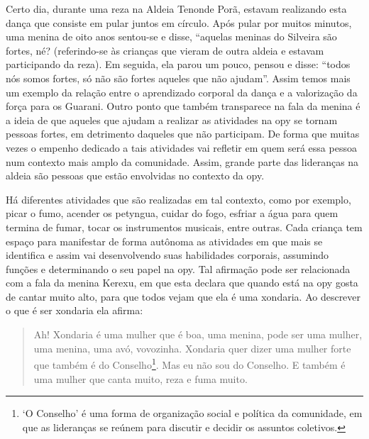 Certo dia, durante uma reza na Aldeia Tenonde Porã, estavam realizando
esta dança que consiste em pular juntos em círculo. Após pular por
muitos minutos, uma menina de oito anos sentou-se e disse, ``aquelas
meninas do Silveira são fortes, né? (referindo-se às crianças que
vieram de outra aldeia e estavam participando da reza). Em seguida, ela
parou um pouco, pensou e disse: ``todos nós somos fortes, só não são
fortes aqueles que não ajudam''. Assim temos mais um exemplo da relação
entre o aprendizado corporal da dança e a valorização da força para os
Guarani. Outro ponto que também transparece na fala da menina é a ideia
de que aqueles que ajudam a realizar as atividades na opy se tornam
pessoas fortes, em detrimento daqueles que não participam. De forma que
muitas vezes o empenho dedicado a tais atividades vai refletir em quem
será essa pessoa num contexto mais amplo da comunidade. Assim, grande
parte das lideranças na aldeia são pessoas que estão envolvidas no
contexto da opy.

Há diferentes atividades que são realizadas em tal contexto, como por
exemplo, picar o fumo, acender os petyngua, cuidar do fogo, esfriar a
água para quem termina de fumar, tocar os instrumentos musicais, entre
outras. Cada criança tem espaço para manifestar de forma autônoma as
atividades em que mais se identifica e assim vai desenvolvendo suas
habilidades corporais, assumindo funções e determinando o seu papel na
opy. Tal afirmação pode ser relacionada com a fala da menina Kerexu, em
que esta declara que quando está na opy gosta de cantar muito alto,
para que todos vejam que ela é uma xondaria. Ao descrever o que é ser
xondaria ela afirma:

\begin{quotation}
Ah! Xondaria é uma mulher que é boa, uma menina, pode ser uma mulher,
uma menina, uma avó, vovozinha. Xondaria quer dizer uma mulher forte
que também é do Conselho\footnote{‘O Conselho’ é uma forma de
organização social e política da comunidade, em que as lideranças se
reúnem para discutir e decidir os assuntos coletivos. }. Mas eu não sou
do Conselho. E também é uma mulher que canta muito, reza e fuma muito.
\end{quotation}

